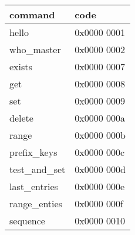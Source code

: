 \begin{table}[ht]
\begin{tabular}{ll}
command & code \\
\hline
hello          & 0x0000 0001 \\
who\_master    & 0x0000 0002 \\
exists         & 0x0000 0007 \\
get            & 0x0000 0008 \\
set            & 0x0000 0009 \\
delete         & 0x0000 000a \\
range          & 0x0000 000b \\
prefix\_keys   & 0x0000 000c \\
test\_and\_set & 0x0000 000d \\
last\_entries  & 0x0000 000e \\
range\_enties  & 0x0000 000f \\
sequence       & 0x0000 0010 \\
\hline
\end{tabular}
\end{table}

